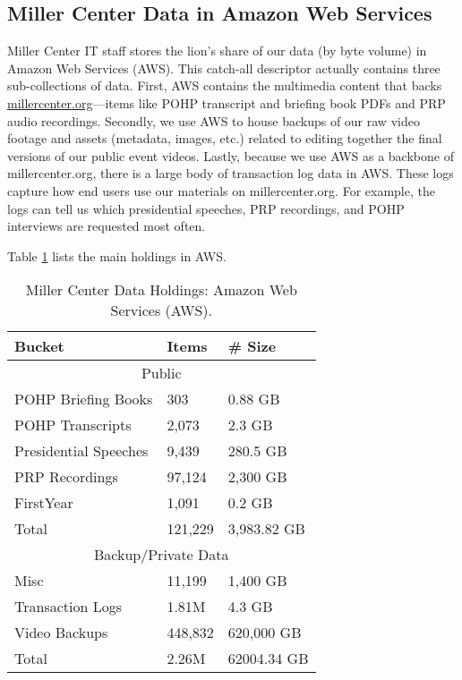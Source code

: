 \documentclass[12pt, oneside]{article}   	%
\begin{document}
\subsection{Miller Center Data in Amazon Web Services}\label{section.data.aws}
Miller Center IT staff stores the lion’s share of our data (by byte volume) in Amazon Web Services (AWS).  This catch-all descriptor actually contains three sub-collections of data.  First, AWS contains the multimedia content that backs \href{https://millercenter.org}{millercenter.org}—items like POHP transcript and briefing book PDFs and PRP audio recordings.   Secondly, we use AWS to house backups of our raw video footage and assets (metadata, images, etc.) related to editing together the final versions of our public event videos.  Lastly, because we use AWS as a backbone of millercenter.org, there is a large body of transaction log data in AWS.  These logs capture how end users use our materials on millercenter.org.  For example, the logs can tell us which presidential speeches, PRP recordings, and POHP interviews are requested most often.

Table \ref{table.data.aws} lists the main holdings in AWS.  

\begin{table}[htp]
\caption{Miller Center Data Holdings: Amazon Web Services (AWS).}
\begin{center}
\begin{tabular}{l l l }
\toprule
Bucket				&	Items		&	\#  Size	\\
\midrule
						\multicolumn{3}{c}{Public}		\\
\midrule
 POHP Briefing Books	&	303			&	0.88 GB \\
 \midrule
 POHP Transcripts		&	2,073		&	2.3 GB	\\
 \midrule
 Presidential Speeches	&	9,439		&	280.5 GB  \\
 \midrule
 PRP Recordings		&	97,124		&	2,300 GB	\\
 \midrule
 FirstYear				&	1,091		&	0.2 GB	\\
 \bottomrule
  Total				&	121,229		&	3,983.82 GB 	\\
 \bottomrule
 						\multicolumn{3}{c}{Backup/Private Data}		\\
 \midrule
 Misc					&	11,199		&	1,400 GB	\\
\midrule
 Transaction Logs		&	1.81M		&	4.3 GB \\
\midrule
 Video Backups			&	448,832		&	620,000 GB \\
\bottomrule
 Total				&	2.26M		&	62004.34 GB 	\\
\bottomrule

\end{tabular}
\end{center}
\label{table.data.aws}
\end{table}%
\end{document}
